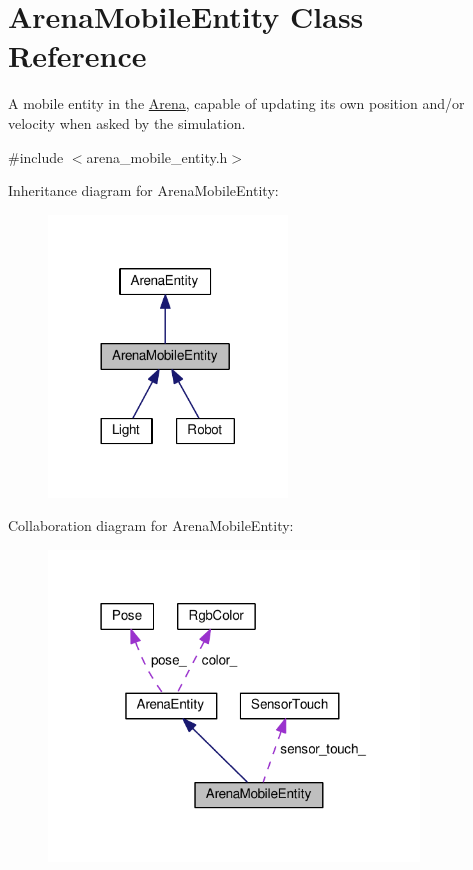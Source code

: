 \hypertarget{classArenaMobileEntity}{}\section{Arena\+Mobile\+Entity Class Reference}
\label{classArenaMobileEntity}


A mobile entity in the \hyperlink{classArena}{Arena}, capable of updating its own position and/or velocity when asked by the simulation.  




{\ttfamily \#include $<$arena\+\_\+mobile\+\_\+entity.\+h$>$}



Inheritance diagram for Arena\+Mobile\+Entity\+:\nopagebreak
\begin{figure}[H]
\begin{center}
\leavevmode
\includegraphics[width=180pt]{classArenaMobileEntity__inherit__graph}
\end{center}
\end{figure}


Collaboration diagram for Arena\+Mobile\+Entity\+:\nopagebreak
\begin{figure}[H]
\begin{center}
\leavevmode
\includegraphics[width=279pt]{classArenaMobileEntity__coll__graph}
\end{center}
\end{figure}
